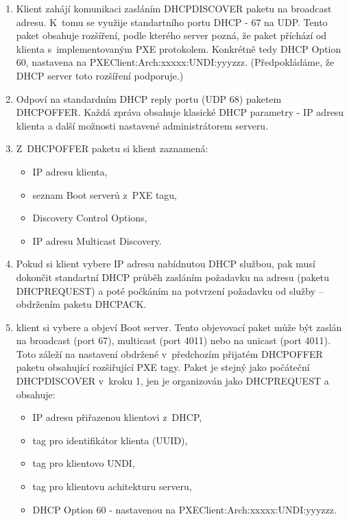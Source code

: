 \begin{enumerate}

\item  Klient zahájí komunikaci zasláním DHCPDISCOVER paketu na broadcast adresu. K~tomu se využije standartního portu DHCP - 67 na UDP. Tento paket obsahuje rozšíření, podle kterého server pozná, že paket příchází od klienta s~implementovaným PXE protokolem. Konkrétně tedy DHCP Option 60, nastavena na PXEClient:Arch:xxxxx:UNDI:yyyzzz. (Předpokládáme, že DHCP server toto rozšíření podporuje.)

\item  Odpoví na standardním DHCP reply portu (UDP 68) paketem DHCPOFFER. Každá zpráva obsahuje klasické DHCP parametry - IP adresu klienta a další možnosti nastavené administrátorem serveru.

\item Z~DHCPOFFER paketu si klient zaznamená:
\begin{itemize}
\item IP adresu klienta,
\item seznam Boot serverů z~PXE tagu,
\item Discovery Control Options,
\item IP adresu Multicast Discovery.

\end{itemize}

\item  Pokud si klient vybere IP adresu nabídnutou DHCP službou, pak musí dokončit standartní DHCP průběh zasláním požadavku na adresu (paketu DHCPREQUEST) a poté počkáním na potvrzení požadavku od služby -- obdržením paketu DHCPACK.

\item  klient si vybere a objeví Boot server. Tento objevovací paket může být zaslán na broadcast (port 67), multicast (port 4011) nebo na unicast (port 4011). Toto záleží na nastavení obdržené v~předchozím přijatém DHCPOFFER paketu obsahující rozšiřující PXE tagy. Paket je stejný jako počáteční DHCPDISCOVER v~kroku 1, jen je organizován jako DHCPREQUEST a obsahuje:

\begin{itemize}
\item IP adresu přiřazenou klientovi z~DHCP,
\item tag pro identifikátor klienta (UUID),
\item tag pro klientovo UNDI,
\item tag pro klientovu achitekturu serveru,
\item DHCP Option 60 - nastavenou na PXEClient:Arch:xxxxx:UNDI:yyyzzz.
\end{itemize}


\end{enumerate}
